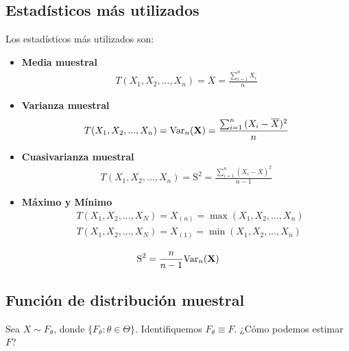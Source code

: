 \subsection{Estadísticos más utilizados}
Los estadísticos más utilizados son:
\begin{itemize}
    \item \textbf{Media muestral}
          \begin{align*}
              T(X_1,X_2, ..., X_n) = \overline{X} = \frac{\sum_{i=1}^{n}{X_i}}{n}
          \end{align*}
    \item \textbf{Varianza muestral}
          \begin{align*}
              T(X_1,X_2, ..., X_n) = \text{Var}_n(\textbf{X}) = \frac{\sum_{i=1}^{n}{(X_i - \overline{X})^2}}{n}
          \end{align*}
    \item \textbf{Cuasivarianza muestral}
          \begin{align*}
              T(X_1,X_2, ..., X_n) = \text{S}^2 = \frac{\sum_{i=1}^{n}{(X_i - \overline{X})^2}}{n-1}
          \end{align*}
    \item \textbf{Máximo y Mínimo}
          \begin{align*}
               & T(X_1,X_2, ..., X_N) = X_{(n)}=  \max(X_1, X_2, ...,X_n) \\
               & T(X_1,X_2, ..., X_N) = X_{(1)} =\min(X_1, X_2, ...,X_n)
          \end{align*}
\end{itemize}

\begin{obs}
    \begin{align*}
        \text{S}^2 = \frac{n}{n-1}\text{Var}_n(\textbf{X})
    \end{align*}
\end{obs}

\subsection{Función de distribución muestral}

Sea $X \sim F_{\theta}$, donde $\{F_{\theta} : \theta \in \Theta \}$.  Identifiquemos $F_{\theta} \equiv F$. ¿Cómo podemos estimar $F$?


